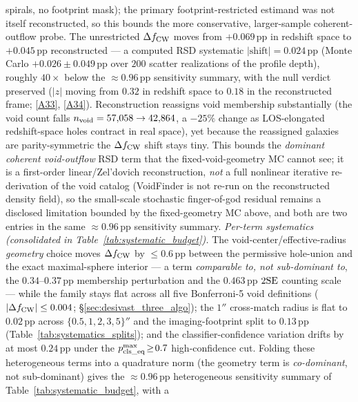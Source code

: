 \documentclass[aps,prd,twocolumn,superscriptaddress,showpacs,preprintnumbers,nofootinbib,longbibliography,floatfix]{revtex4-2}
\newcommand{\repoBase}{https://github.com/Hubify-Projects/bigbounce/blob/main}
\begin{document}
spirals, no footprint mask); the primary footprint-restricted estimand
was not itself reconstructed, so this bounds the more conservative,
larger-sample coherent-outflow probe. The unrestricted
$\Delta f_{\rm CW}$ moves from $+0.069$\,pp in redshift space to
$+0.045$\,pp reconstructed --- a computed RSD systematic
$|\text{shift}| = 0.024$\,pp (Monte Carlo $+0.026 \pm 0.049$\,pp over
$200$ scatter realizations of the profile depth), roughly $40\times$
below the ${\approx}0.96$\,pp sensitivity summary, with the null verdict
preserved ($|z|$ moving from $0.32$ in redshift space to $0.18$ in the
reconstructed frame;
\href{\repoBase/pipelines/p5\_desi\_chirality/outputs/27\_rsd\_void\_recon\_bound.json}{[A33]},
\href{\repoBase/pipelines/p5\_desi\_chirality/scripts/27\_rsd\_void\_recon\_bound.py}{[A34]}).
Reconstruction reassigns void membership substantially (the void count
falls $n_{\rm void}=57{,}058\to42{,}864$, a ${-}25\%$ change as
LOS-elongated redshift-space holes contract in real space), yet because
the reassigned galaxies are parity-symmetric the $\Delta f_{\rm CW}$
shift stays tiny.
This bounds the \emph{dominant coherent void-outflow} RSD term that the
fixed-void-geometry MC cannot see; it is a first-order linear/Zel'dovich
reconstruction, \emph{not} a full nonlinear iterative re-derivation of
the void catalog (VoidFinder is not re-run on the reconstructed density
field), so the small-scale stochastic finger-of-god residual remains a
disclosed limitation bounded by the fixed-geometry MC above, and both
are two entries in the same ${\approx}0.96$\,pp sensitivity summary.
\emph{Per-term systematics (consolidated in
Table~\ref{tab:systematic_budget}).} The void-center/effective-radius
\emph{geometry} choice moves $\Delta f_{\rm CW}$ by $\le 0.6$\,pp between
the permissive hole-union and the exact maximal-sphere interior --- a
term \emph{comparable to, not sub-dominant to}, the
$0.34$--$0.37$\,pp membership perturbation and the $0.463$\,pp $2{\rm SE}$ counting scale
--- while the family stays flat across all five Bonferroni-5 void
definitions ($|\Delta f_{\rm CW}| \le 0.004$;
\S\ref{sec:desivast_three_algo}); the $1''$ cross-match radius is flat to
$0.02$\,pp across $\{0.5,1,2,3,5\}''$ and the imaging-footprint split to
$0.13$\,pp (Table~\ref{tab:systematics_splits}); and the
classifier-confidence variation drifts by at most $0.24$\,pp under the
$p_{\rm cls\_eq}^{\max}\!\ge\!0.7$ high-confidence cut. Folding these
heterogeneous terms into a quadrature norm (the geometry term is
\emph{co-dominant}, not sub-dominant) gives the ${\approx}0.96$\,pp
heterogeneous sensitivity summary of Table~\ref{tab:systematic_budget}, with a
\end{document}
